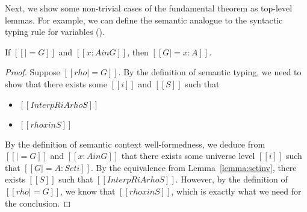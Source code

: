 \documentclass[acmsmall,screen=true,
\ifpublic review=false\else,review=true\fi
  ,anonymous=\ifanonymous true\else false\fi]{acmart}
\newcommand{\scw}[1]{}
\begin{document}


Next, we show some non-trivial cases of the fundamental theorem as
top-level lemmas. For example, we can define the semantic analogue to the
syntactic typing rule for variables ().
\begin{lemma}[ST-Var]
  \label{lemma:stvar}
  If $[[|= G]]$ and $[[x : A in G]]$, then $[[G |= x : A]]$.
\end{lemma}
\begin{proof}
  Suppose $[[rho |= G]]$. By the definition of semantic typing, we
  need to show that there exists some $[[i]]$ and $[[S]]$ such that
  \begin{itemize}
  \item $[[InterpR i A { rho } S]]$
  \item $[[rho x in S]]$
  \end{itemize}
  By the definition of semantic context well-formedness, we deduce
  from $[[|= G]]$ and $[[x : A in G]]$ that there exists some universe
  level $[[i]]$ such that $[[G |= A : Set i]]$. By
  the equivalence from Lemma~\ref{lemma:setinv}, there exists $[[S]]$
  such that $[[InterpR i A {rho} S]]$. However, by the definition of
  $[[rho |= G]]$, we know that $[[rho x in S]]$, which is exactly what
  we need for the conclusion.
\end{proof}

\end{document}
